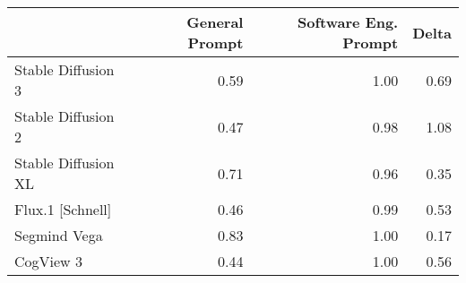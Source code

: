 \begin{tabular}{lrrr}
\toprule
 & General Prompt & Software Eng. Prompt & Delta \\
\midrule
Stable Diffusion 3 & 0.59 & 1.00 & 0.69 \\
Stable Diffusion 2 & 0.47 & 0.98 & 1.08 \\
Stable Diffusion XL & 0.71 & 0.96 & 0.35 \\
Flux.1 [Schnell] & 0.46 & 0.99 & 0.53 \\
Segmind Vega & 0.83 & 1.00 & 0.17 \\
CogView 3 & 0.44 & 1.00 & 0.56 \\
\bottomrule
\end{tabular}
